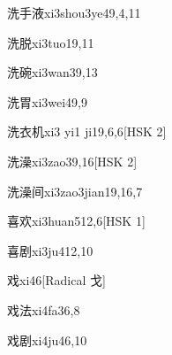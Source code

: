 \begin{entry}{洗手液}{xi3shou3ye4}{9,4,11}
\end{entry}

\begin{entry}{洗脱}{xi3tuo1}{9,11}
\end{entry}

\begin{entry}{洗碗}{xi3wan3}{9,13}
\end{entry}

\begin{entry}{洗胃}{xi3wei4}{9,9}
\end{entry}

\begin{entry}{洗衣机}{xi3 yi1 ji1}{9,6,6}[HSK 2]
\end{entry}

\begin{entry}{洗澡}{xi3zao3}{9,16}[HSK 2]
\end{entry}

\begin{entry}{洗澡间}{xi3zao3jian1}{9,16,7}
\end{entry}

\begin{entry}{喜欢}{xi3huan5}{12,6}[HSK 1]
\end{entry}

\begin{entry}{喜剧}{xi3ju4}{12,10}
\end{entry}

\begin{entry}{戏}{xi4}{6}[Radical 戈]
\end{entry}

\begin{entry}{戏法}{xi4fa3}{6,8}
\end{entry}

\begin{entry}{戏剧}{xi4ju4}{6,10}
\end{entry}

